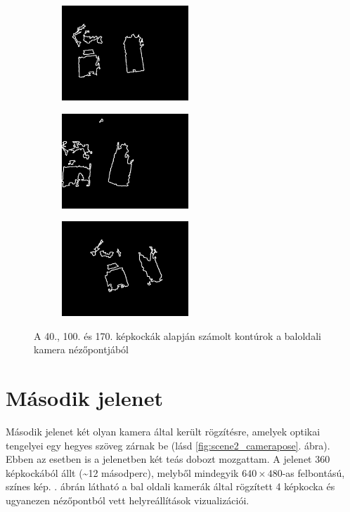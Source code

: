 \begin{figure}[tbh]
\centering
\begin{subfigure}[b]{.32\linewidth}
	\centering
	\includegraphics[width=135pt]{figures/contour_93.png}
  \end{subfigure}
\begin{subfigure}[b]{.32\linewidth}
	\centering
	\includegraphics[width=135pt]{figures/contour_153.png}
  \end{subfigure}
\begin{subfigure}[b]{.32\linewidth}
	\centering
	\includegraphics[width=135pt]{figures/contour_223.png}
  \end{subfigure}
\caption{A 40., 100. és 170. képkockák alapján számolt kontúrok a baloldali kamera nézőpontjából \label{fig:scene1_contours}}
\end{figure}

\section{Második jelenet}

Második jelenet két olyan kamera által került rögzítésre, amelyek optikai tengelyei egy hegyes szöveg zárnak be (lásd \ref{fig:scene2_camerapose}. ábra). Ebben az esetben is a jelenetben két teás dobozt mozgattam. A jelenet 360 képkockából állt (\textasciitilde 12 másodperc), melyből mindegyik $640\times 480$-as felbontású, színes kép. . ábrán látható a bal oldali kamerák által rögzített 4 képkocka és ugyanezen nézőpontból vett helyreállítások vizualizációi.

